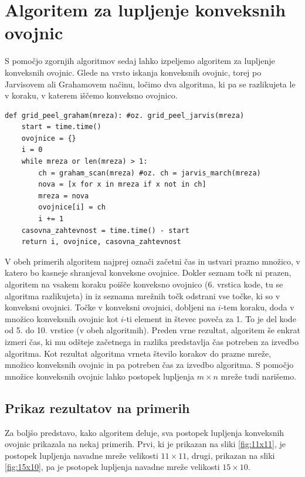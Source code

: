 \documentclass[a4paper]{article}
\begin{document}
\section{Algoritem za lupljenje konveksnih ovojnic}
S pomočjo zgornjih algoritmov sedaj lahko izpeljemo algoritem za lupljenje konveksnih ovojnic. Glede na vrsto iskanja konveksnih ovojnic, torej po Jarvisovem ali 
Grahamovem načinu, ločimo dva algoritma, ki pa se razlikujeta le v koraku, v katerem iščemo konveksno ovojnico.

\begin{lstlisting}
def grid_peel_graham(mreza): #oz. grid_peel_jarvis(mreza)
    start = time.time()
    ovojnice = {}
    i = 0
    while mreza or len(mreza) > 1:
        ch = graham_scan(mreza) #oz. ch = jarvis_march(mreza)
        nova = [x for x in mreza if x not in ch]
        mreza = nova
        ovojnice[i] = ch
        i += 1
    casovna_zahtevnost = time.time() - start 
    return i, ovojnice, casovna_zahtevnost
\end{lstlisting}

V obeh primerih algoritem najprej označi začetni čas in ustvari prazno množico, v katero bo kasneje shranjeval konveksne ovojnice. Dokler seznam točk ni prazen, algoritem na vsakem koraku 
poišče konveksno ovojnico (6. vrstica kode, tu se algoritma razlikujeta) in iz seznama mrežnih točk odstrani vse točke, ki so v konveksni ovojnici. Točke v konveksni ovojnici, dobljeni na 
$i$-tem koraku, doda v množico konveksnih ovojnic kot $i$-ti element in števec poveča za 1. To je del kode od 5. do 10. vrstice (v obeh algoritmih). Preden vrne rezultat, algoritem še enkrat 
izmeri čas, ki mu odšteje začetnega in razlika predstavlja čas potreben za izvedbo algoritma. Kot rezultat algoritma vrneta število korakov do prazne mreže, množico konveksnih ovojnic in pa 
potreben čas za izvedbo algoritma. S pomočjo množice konveksnih ovojnic lahko postopek lupljenja $m \times n$ mreže tudi narišemo.

\subsection{Prikaz rezultatov na primerih}
Za boljšo predstavo, kako algoritem deluje, sva postopek lupljenja konveksnih ovojnic prikazala na nekaj primerih. Prvi, ki je prikazan na sliki \ref{fig:11x11}, je postopek lupljenja 
navadne mreže velikosti $11 \times 11$, drugi, prikazan na sliki \ref{fig:15x10}, pa je psotopek lupljenja navadne mreže velikosti $15 \times 10$. 
\end{document}
